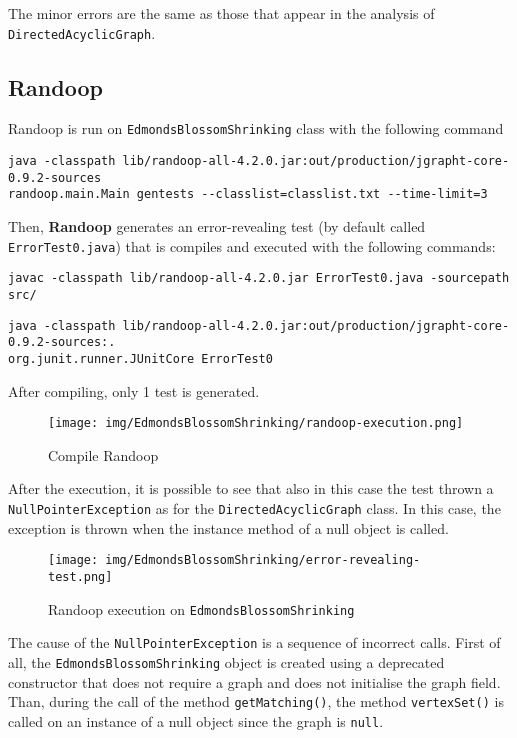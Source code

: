 \documentclass[a4paper,12pt]{article} %
\begin{document}
	The minor errors are the same as those that appear in the analysis of \texttt{DirectedAcyclicGraph}.
		
	\subsection*{Randoop}
	Randoop is run on \texttt{EdmondsBlossomShrinking} class with the following command
	
	\begin{lstlisting}[style=DOS,caption={Randoop Execution}, captionpos=b]
java -classpath lib/randoop-all-4.2.0.jar:out/production/jgrapht-core-0.9.2-sources 
randoop.main.Main gentests --classlist=classlist.txt --time-limit=3
	\end{lstlisting}
	
	Then, \textbf{Randoop} generates an error-revealing test (by default called \\ \texttt{ErrorTest0.java}) that is compiles and executed with the following commands:
	\begin{lstlisting}[style=DOS,caption={Compile Error Revealing Test}, captionpos=b]
javac -classpath lib/randoop-all-4.2.0.jar ErrorTest0.java -sourcepath src/
	\end{lstlisting}
	
	\begin{lstlisting}[style=DOS,caption={Execute Error Revealing Test}, captionpos=b]
java -classpath lib/randoop-all-4.2.0.jar:out/production/jgrapht-core-0.9.2-sources:. 
org.junit.runner.JUnitCore ErrorTest0
	\end{lstlisting}	
	
After compiling, only 1 test is generated.
	\begin{figure}[H]
		\centering
		\texttt{[image: img/EdmondsBlossomShrinking/randoop-execution.png]}
		\caption{Compile {Randoop}}
		\label{fig:randexe-ed}
	\end{figure}
	
	After the execution, it is possible to see that also in this case the test thrown a \texttt{NullPointerException} as for the \texttt{DirectedAcyclicGraph} class.
	In this case, the exception is thrown when the instance method of a null object is called.
	
	\begin{figure}[H]
		\centering
		\texttt{[image: img/EdmondsBlossomShrinking/error-revealing-test.png]}	
		\caption{Randoop execution on \texttt{EdmondsBlossomShrinking}}
		\label{fig:randtest-ed}
	\end{figure}
	
	
	
	
	The cause of the \texttt{NullPointerException} is a sequence of incorrect calls. 
	First of all, the \texttt{EdmondsBlossomShrinking} object is created using a deprecated constructor that does not require a graph and does not initialise the graph field. 
	Than, during the call of the method \texttt{getMatching()}, the method \texttt{vertexSet()} is called on an instance of a null object since the graph is \texttt{null}. 
	
\end{document}
